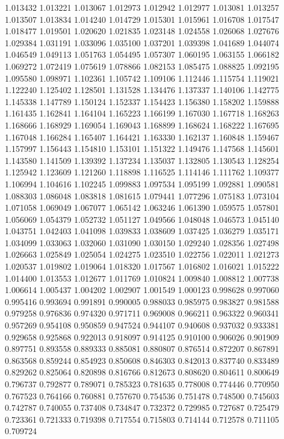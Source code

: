 1.013432
1.013221
1.013067
1.012973
1.012942
1.012977
1.013081
1.013257
1.013507
1.013834
1.014240
1.014729
1.015301
1.015961
1.016708
1.017547
1.018477
1.019501
1.020620
1.021835
1.023148
1.024558
1.026068
1.027676
1.029384
1.031191
1.033096
1.035100
1.037201
1.039398
1.041689
1.044074
1.046549
1.049113
1.051763
1.054495
1.057307
1.060195
1.063155
1.066182
1.069272
1.072419
1.075619
1.078866
1.082153
1.085475
1.088825
1.092195
1.095580
1.098971
1.102361
1.105742
1.109106
1.112446
1.115754
1.119021
1.122240
1.125402
1.128501
1.131528
1.134476
1.137337
1.140106
1.142775
1.145338
1.147789
1.150124
1.152337
1.154423
1.156380
1.158202
1.159888
1.161435
1.162841
1.164104
1.165223
1.166199
1.167030
1.167718
1.168263
1.168666
1.168929
1.169054
1.169043
1.168899
1.168624
1.168222
1.167695
1.167048
1.166284
1.165407
1.164421
1.163330
1.162137
1.160848
1.159467
1.157997
1.156443
1.154810
1.153101
1.151322
1.149476
1.147568
1.145601
1.143580
1.141509
1.139392
1.137234
1.135037
1.132805
1.130543
1.128254
1.125942
1.123609
1.121260
1.118898
1.116525
1.114146
1.111762
1.109377
1.106994
1.104616
1.102245
1.099883
1.097534
1.095199
1.092881
1.090581
1.088303
1.086048
1.083818
1.081615
1.079441
1.077296
1.075183
1.073104
1.071058
1.069049
1.067077
1.065142
1.063246
1.061390
1.059575
1.057801
1.056069
1.054379
1.052732
1.051127
1.049566
1.048048
1.046573
1.045140
1.043751
1.042403
1.041098
1.039833
1.038609
1.037425
1.036279
1.035171
1.034099
1.033063
1.032060
1.031090
1.030150
1.029240
1.028356
1.027498
1.026663
1.025849
1.025054
1.024275
1.023510
1.022756
1.022011
1.021273
1.020537
1.019802
1.019064
1.018320
1.017567
1.016802
1.016021
1.015222
1.014400
1.013553
1.012677
1.011769
1.010824
1.009840
1.008812
1.007738
1.006614
1.005437
1.004202
1.002907
1.001549
1.000123
0.998628
0.997060
0.995416
0.993694
0.991891
0.990005
0.988033
0.985975
0.983827
0.981588
0.979258
0.976836
0.974320
0.971711
0.969008
0.966211
0.963322
0.960341
0.957269
0.954108
0.950859
0.947524
0.944107
0.940608
0.937032
0.933381
0.929658
0.925868
0.922013
0.918097
0.914125
0.910100
0.906026
0.901909
0.897751
0.893558
0.889333
0.885081
0.880807
0.876514
0.872207
0.867891
0.863568
0.859244
0.854923
0.850608
0.846303
0.842013
0.837740
0.833489
0.829262
0.825064
0.820898
0.816766
0.812673
0.808620
0.804611
0.800649
0.796737
0.792877
0.789071
0.785323
0.781635
0.778008
0.774446
0.770950
0.767523
0.764166
0.760881
0.757670
0.754536
0.751478
0.748500
0.745603
0.742787
0.740055
0.737408
0.734847
0.732372
0.729985
0.727687
0.725479
0.723361
0.721333
0.719398
0.717554
0.715803
0.714144
0.712578
0.711105
0.709724
